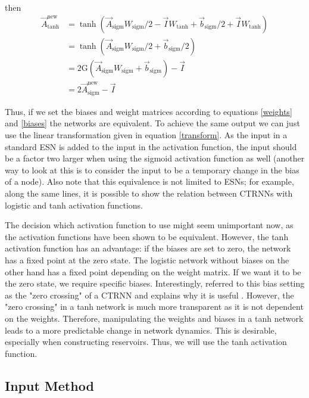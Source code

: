 \documentclass[10pt,a4paper]{report}
\begin{document}
then
\begin{align*}
 \vec{A}_{\text{tanh}}^{\text{new}} &= \tanh( \vec{A}_{\text{sigm}} W_{\text{sigm}} / 2 - \vec{I} W_{\text{tanh}} + \vec{b}_{\text{sigm}} / 2 + \vec{I} W_{\text{tanh}} )  \\
 &= \tanh( \vec{A}_{\text{sigm}} W_{\text{sigm}} / 2 + \vec{b}_{\text{sigm}} / 2 )   \\
 &= 2 \mathrm{G}( \vec{A}_{\text{sigm}} W_{\text{sigm}} + \vec{b}_{\text{sigm}} ) - \vec{I} \\
 &= 2 \vec{A}_{\text{sigm}}^{\text{new}} - \vec{I}  
\end{align*}

Thus, if we set the biases and weight matrices according to equations \ref{weights} and \ref{biases} the networks are equivalent. To achieve the same output we can just use the linear transformation given in equation \ref{transform}. As the input in a standard ESN is added to the input in the activation function, the input should be a factor two larger when using the sigmoid activation function as well (another way to look at this is to consider the input to be a temporary change in the bias of a node). Also note that this equivalence is not limited to ESNs; for example, along the same lines, it is possible to show the relation between CTRNNs with logistic and tanh activation functions.  

The decision which activation function to use might seem unimportant now, as the activation functions have been shown to be equivalent. However, the tanh activation function has an advantage: if the biases are set to zero, the network has a fixed point at the zero state. The logistic network without biases on the other hand has a fixed point depending on the weight matrix. If we want it to be the zero state, we require specific biases. Interestingly, \citet{Beer1995} referred to this bias setting as the "zero crossing" of a CTRNN and explains why it is useful . However, the "zero crossing" in a tanh network is much more transparent as it is not dependent on the weights. Therefore, manipulating the weights and biases in a tanh network leads to a more predictable change in network dynamics. This is desirable, especially when constructing reservoirs. Thus, we will use the tanh activation function.

\subsection*{Input Method} 
\end{document}
